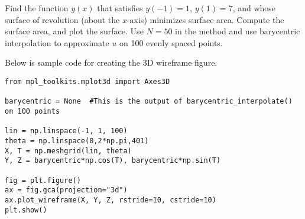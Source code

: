 Find the function $y(x)$ that satisfies $y(-1) = 1$, $y(1) = 7$, and whose surface of revolution (about the $x$-axis) minimizes surface area.
Compute the surface area, and plot the surface. \label{prob:pseudospectral1_revision:minimal_surface}
Use $N=50$ in the  method and use barycentric interpolation to approximate $u$ on 100 evenly spaced points.

Below is sample code for creating the 3D wireframe figure.
\begin{lstlisting}
from mpl_toolkits.mplot3d import Axes3D

barycentric = None	#This is the output of barycentric_interpolate() on 100 points

lin = np.linspace(-1, 1, 100)
theta = np.linspace(0,2*np.pi,401)
X, T = np.meshgrid(lin, theta)
Y, Z = barycentric*np.cos(T), barycentric*np.sin(T)

fig = plt.figure()
ax = fig.gca(projection="3d")
ax.plot_wireframe(X, Y, Z, rstride=10, cstride=10)
plt.show()
\end{lstlisting}

